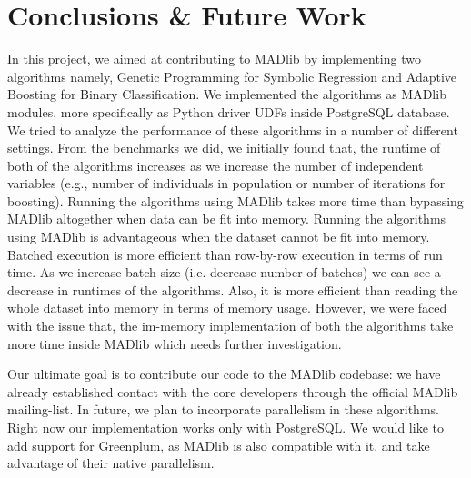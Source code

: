 
\section{Conclusions \& Future Work}
\label{sec:con}
In this project, we aimed at contributing to MADlib by implementing two algorithms namely, Genetic Programming for Symbolic Regression and Adaptive Boosting for Binary Classification. We implemented the algorithms as MADlib modules, more specifically as Python driver UDFs inside PostgreSQL database. We tried to analyze the performance of these algorithms in a number of different settings. From the benchmarks we did, we initially found that, the runtime of both of the algorithms increases as we increase the number of independent variables (e.g., number of individuals in population or number of iterations for boosting). Running the algorithms using MADlib takes more time than bypassing MADlib altogether when data can be fit into memory. Running the algorithms using MADlib is advantageous when the dataset cannot be fit into memory. Batched execution is more efficient than row-by-row execution in terms of run time. As we increase batch size (i.e. decrease number of batches) we can see a decrease in runtimes of the algorithms. Also, it is more efficient than reading the whole dataset into memory in terms of memory usage. However, we were faced with the issue that, the im-memory implementation of both the algorithms take more time inside MADlib which needs further investigation. 

Our ultimate goal is to contribute our code to the MADlib codebase: we have already established contact with the core developers through the official MADlib mailing-list. In future, we plan to incorporate parallelism in these algorithms. Right now our implementation works only with PostgreSQL. We would like to add support for Greenplum, as MADlib is also compatible with it, and take advantage of their native parallelism. 
